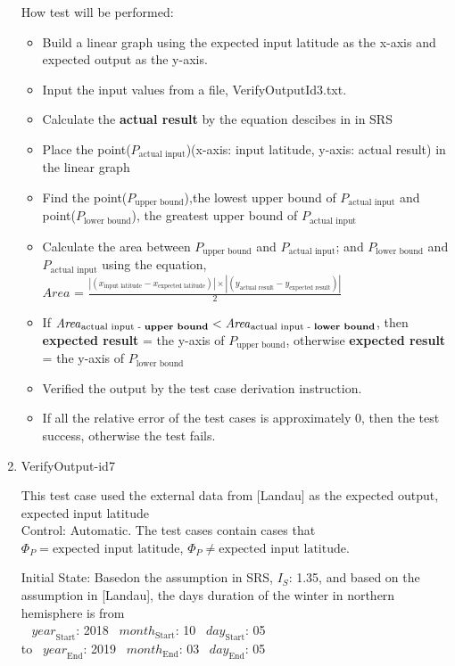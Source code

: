 \documentclass[12pt, titlepage]{article}
\begin{document}
\begin{enumerate}

How test will be performed: 
\begin{itemize}
\item Build a linear graph using the expected input latitude as the x-axis 
and expected output as the y-axis. 
\item Input the input values from a file, VerifyOutputId3.txt.
\item Calculate the \textbf{actual result} by the equation descibes in in
SRS\cite{YS2019}
\item Place the point($P_\text{actual input}$)(x-axis: input latitude, y-axis:
actual result) in the linear graph
\item Find the point($P_\text{upper bound}$),the lowest upper bound of
$P_\text{actual input}$ and point($P_\text{lower bound}$), the greatest upper
bound of $P_\text{actual input}$
\item Calculate the area between $P_\text{upper bound}$ and $P_\text{actual
input}$; and $P_\text{lower bound}$ and $P_\text{actual input}$ using the
equation,\\
$\mathit{Area}$ = $\frac{|(x_{\text{input latitude}}-x_{\text{expected
latitude}})| \times |(y_{\text{actual result}}-y_{\text{expected result}})|}{2}$
\item If $\mathit{Area}_{\text{actual input - \textbf{upper bound}}} <
\mathit{Area}_{\text{actual input - \textbf{lower bound}}}$,
then \textbf{expected result} = the y-axis of $P_\text{upper bound}$, otherwise
\textbf{expected result} = the y-axis of $P_\text{lower bound}$
\item Verified the output by the test case derivation instruction. 
\item If all the relative error of the test cases is approximately
0, then the test success, otherwise the test fails. 
\end{itemize}

\item{VerifyOutput-id7\\} 

This test case used the external data from [Landau\cite{Charles2001}]
as the expected output, expected input latitude\\

Control: Automatic. The test cases contain cases that $\Phi_P = \text{expected
input latitude}$, $\Phi_P \ne \text{expected input latitude}$. 

Initial State:
Basedon the assumption in SRS\cite{YS2019}, $I_{S}$: 1.35, and based on the
assumption in [Landau\cite{Charles2001}], the days duration of the winter in
northern hemisphere is from\\
~ $\mathit{year}_\text{Start}$: 2018
~$\mathit{month}_\text{Start}$: 10 
~$\mathit{day}_\text{Start}$: 05 \\
 to
~$\mathit{year}_\text{End}$: 2019 
~$\mathit{month}_\text{End}$: 03
~$\mathit{day}_\text{End}$: 05\\


\end{enumerate}
\end{document}
